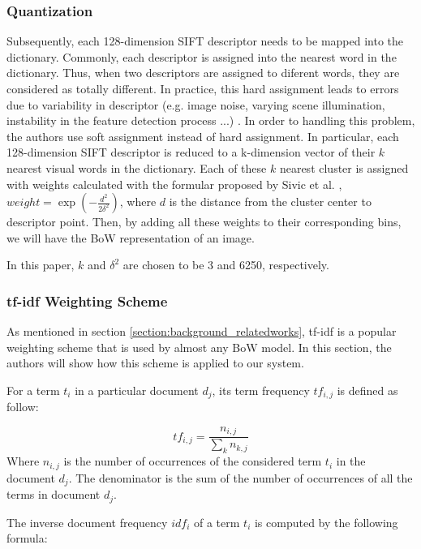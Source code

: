 \subsubsection{Quantization} \label{section:quantization}

Subsequently, each 128-dimension SIFT descriptor needs to be mapped into the dictionary. Commonly, each descriptor is assigned into the nearest word in the dictionary. Thus, when two descriptors are assigned to diferent words, they are considered as totally different. In practice, this hard assignment leads to errors due to variability in descriptor (e.g. image noise, varying scene illumination, instability in the feature detection process ...) \cite{7}. In order to handling this problem, the authors use soft assignment instead of hard assignment. In particular, each 128-dimension SIFT descriptor is reduced to a k-dimension vector of their $k$ nearest visual words in the dictionary. Each of these $k$ nearest cluster is assigned with weights calculated with the formular proposed by Sivic et al. \cite{7}, $weight = \exp(-\frac{d^2}{2\delta^2})$, where $d$ is the distance from the cluster center to descriptor point. Then, by adding all these weights to their corresponding bins, we will have the BoW representation of an image.

In this paper, $k$ and $\delta^2$ are chosen to be 3 and 6250, respectively.

\subsubsection{tf-idf Weighting Scheme} \label{section:tfidf_weighting}

As mentioned in section \ref{section:background_relatedworks}, tf-idf is a popular weighting scheme that is used by almost any BoW model. In this section, the authors will show how this scheme is applied to our system.

For a term $t_{i}$ in a particular document $d_{j}$, its term frequency $tf_{i, j}$ is defined as follow:

\begin{equation} 
        tf_{i, j} = \frac{n_{i, j}}{\sum\limits_{k} n_{k, j}}
\end{equation}
Where $n_{i, j}$ is the number of occurrences of the considered term $t_{i}$ in the document $d_{j}$. The denominator is the sum of the number of occurrences of all the terms in document $d_{j}$.

The inverse document frequency $idf_{i}$ of a term $t_{i}$ is computed by the following formula:

